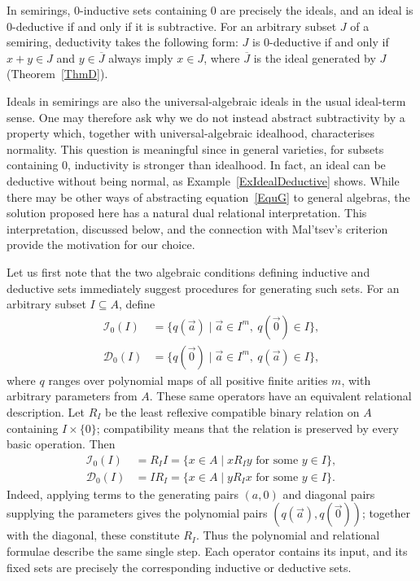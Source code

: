 \documentclass[12pt,english]{amsart}
\theoremstyle{definition}
\numberwithin{equation}{section}
\theoremstyle{remark}
\begin{document}
In semirings, $0$-inductive sets containing $0$ are precisely the ideals, and an ideal is $0$-deductive if and only if it is subtractive. For an arbitrary subset $J$ of a semiring, deductivity takes the following form: $J$ is $0$-deductive if and only if $x+y\in J$ and $y\in\overline J$ always imply $x\in J$, where $\overline J$ is the ideal generated by $J$ (Theorem~\ref{ThmD}).

Ideals in semirings are also the universal-algebraic ideals in the usual ideal-term sense. One may therefore ask why we do not instead abstract subtractivity by a property which, together with universal-algebraic idealhood, characterises normality. This question is meaningful since in general varieties, for subsets containing $0$, inductivity is stronger than idealhood. In fact, an ideal can be deductive without being normal, as Example~\ref{ExIdealDeductive} shows. While there may be other ways of abstracting equation~\eqref{EquG} to general algebras, the solution proposed here has a natural dual relational interpretation. This interpretation, discussed below, and the connection with Mal'tsev's criterion provide the motivation for our choice.

Let us first note that the two algebraic conditions defining inductive and deductive sets immediately suggest procedures for generating such sets. For an arbitrary subset $I\subseteq A$, define
\begin{align*}
\mathcal I_0(I)
&=\{q(\vec a)\mid \vec a\in I^m,\ q(\vec0)\in I\},\\
\mathcal D_0(I)
&=\{q(\vec0)\mid \vec a\in I^m,\ q(\vec a)\in I\},
\end{align*}
where $q$ ranges over polynomial maps of all positive finite arities $m$, with arbitrary parameters from $A$. These same operators have an equivalent relational description. Let $R_I$ be the least reflexive compatible binary relation on $A$ containing $I\times\{0\}$; compatibility means that the relation is preserved by every basic operation. Then
\begin{align*}
\mathcal I_0(I)&=R_I I
 =\{x\in A\mid xR_I y\text{ for some }y\in I\},\\
\mathcal D_0(I)&=I R_I
 =\{x\in A\mid yR_I x\text{ for some }y\in I\}.
\end{align*}
Indeed, applying terms to the generating pairs $(a,0)$ and diagonal pairs supplying the parameters gives the polynomial pairs $(q(\vec a),q(\vec0))$; together with the diagonal, these constitute $R_I$. Thus the polynomial and relational formulae describe the same single step. Each operator contains its input, and its fixed sets are precisely the corresponding inductive or deductive sets.
\end{document}

